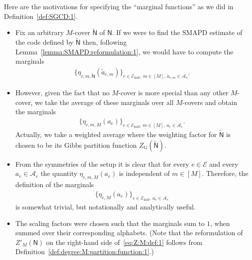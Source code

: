 \documentclass[journal, twocolumn]{IEEEtran}
\newcommand{\set}[1]{\mathcal{#1}}
\newcommand{\graph}[1]{\mathsf{#1}}
\newcommand{\setA}{\set{A}}
\newcommand{\setE}{\set{E}}
\newcommand{\setEhalf}{\set{E}_{\mathrm{half}}}
\newcommand{\graphN}{\graph{N}}
\newcommand{\cover}[1]{\tilde{#1}}
\newcommand{\cgraph}[1]{\cover{\graph{#1}}}
\newcommand{\?}{\mathrm{?}}
\newcommand{\ZGibbsext}[1]{Z_{\mathrm{G}}(#1)}
\begin{document}
Here are the motivations for specifying the ``marginal functions'' as we did
in Definition~\ref{def:SGCD:1}.
\begin{itemize}

\item Fix an arbitrary $M$-cover $\cgraph{N}$ of $\graphN$. If we were to find
  the SMAPD estimate of the code defined by $\cgraph{N}$ then, following
  Lemma~\ref{lemma:SMAPD:reformulation:1}, we would have to compute the
  marginals
  \begin{align*}
    \big\{
      \eta_{e,m,\cgraph{N}}(\cover{a}_{e,m})
    \big\}_{e \in \setEhalf, \, m \in [M], \, \cover{a}_{e,m} \in \setA_e}.
  \end{align*}

\item However, given the fact that no $M$-cover is more special than any other
  $M$-cover, we take the average of these marginals over all $M$-covers and
  obtain the marginals
  \begin{align*}
    \big\{
      \eta_{e,m,M}(a_e)
    \big\}_{e \in \setEhalf, \, m \in [M], \, a_e \in \setA_e}.
  \end{align*}
  Actually, we take a weighted average where the weighting factor for
  $\cgraph{N}$ is chosen to be its Gibbs partition function
  $\ZGibbsext{\cgraph{N}}$.

\item From the symmetries of the setup it is clear that for every $e \in
  \setE$ and every $a_e \in \setA_e$ the quantity $\eta_{e,m,M}(a_e)$ is
  independent of $m \in [M]$. Therefore, the definition of the marginals
  \begin{align*}
    \big\{
      \eta_{e,M}(a_e)
    \big\}_{e \in \setEhalf, \, a_e \in \setA_e}
  \end{align*}
  is somewhat trivial, but notationally and analytically useful.

\item The scaling factors were chosen such that the marginals sum to $1$, when
  summed over their corresponding alphabets. (Note that the reformulation of
  $Z'_M(\graphN)$ on the right-hand side of~\eqref{eq:Z:M:def:1} follows from
  Definition~\ref{def:degree:M:partition:function:1}.)

\end{itemize}
\end{document}

